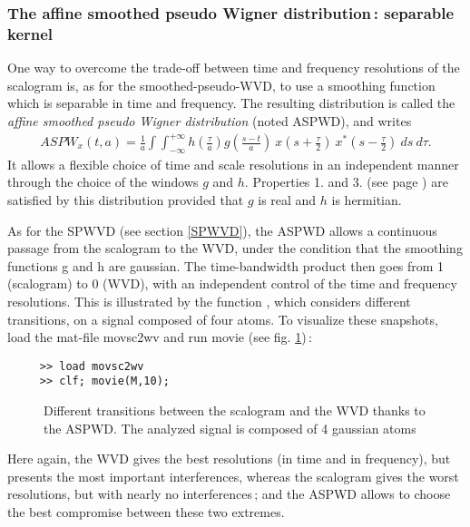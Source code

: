\subsubsection{The affine smoothed pseudo Wigner distribution\,: separable
kernel} \label{aspwd} One
way to overcome the trade-off between time and frequency resolutions of the
scalogram is, as for the smoothed-pseudo-WVD, to use a smoothing function
which is separable in time and frequency. The resulting distribution is
called the {\it affine smoothed pseudo Wigner distribution} (noted ASPWD),
and writes
\begin{eqnarray}
\label{ASPW}
ASPW_x(t,a) = \frac{1}{a} \int\int_{-\infty}^{+\infty}
h\left(\frac{\tau}{a}\right)g\left(\frac{s-t}{a}\right)\ x(s+\frac{\tau}{2})\
x^*(s-\frac{\tau}{2})\ ds\ d\tau. 
\end{eqnarray}
It allows a flexible choice of time and scale resolutions in an independent
manner through the choice of the windows $g$ and $h$. Properties 1. and
3. (see page \pageref{propertiesaff}) are satisfied by this distribution
provided that $g$ is real and $h$ is hermitian.

  As for the SPWVD (see section \ref{SPWVD}), the ASPWD allows a continuous
passage from the scalogram to the WVD, under the condition that the
smoothing functions g and h are gaussian. The time-bandwidth product then
goes from 1 (scalogram) to 0 (WVD), with an independent control of the time
and frequency resolutions. This is illustrated by the function
, which considers different
transitions, on a signal composed of four atoms. To visualize these
snapshots, load the mat-file {\ttfamily movsc2wv} and run {\ttfamily movie}
(see fig. \ref{En2fig2})\,:
\begin{verbatim}
     >> load movsc2wv
     >> clf; movie(M,10);
\end{verbatim}
\begin{figure}[htb]
\epsfxsize=10cm
\epsfysize=10cm
\centerline{}
\caption{\label{En2fig2}Different transitions between the scalogram and the
WVD thanks to the ASPWD. The analyzed signal is composed of 4 gaussian atoms}
\end{figure}
Here again, the WVD gives the best resolutions (in time and in frequency),
but presents the most important interferences, whereas the scalogram gives
the worst resolutions, but with nearly no interferences\,; and the ASPWD
allows to choose the best compromise between these two extremes.\\


